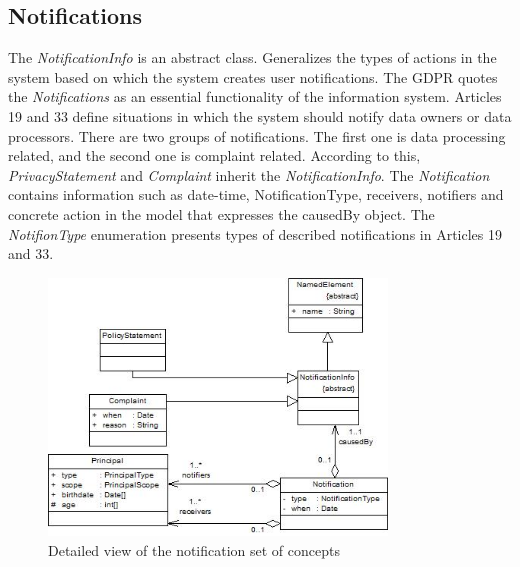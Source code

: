 \documentclass[11pt,english]{article}
\begin{document}
\subsection{Notifications}
The \emph{NotificationInfo} is an abstract class. Generalizes the types of actions in the system based on which the system creates user notifications. The GDPR quotes the \emph{Notifications} as an essential functionality of the information system. Articles 19 and 33 define situations in which the system should notify data owners or data processors. There are two groups of notifications. The first one is data processing related, and the second one is complaint related. According to this, \emph{PrivacyStatement} and \emph{Complaint} inherit the \emph{NotificationInfo}. The \emph{Notification} contains information such as date-time, NotificationType, receivers, notifiers and concrete action in the model that expresses the causedBy object. The \emph{NotifionType} enumeration presents types of described notifications in Articles 19 and 33.
\begin{figure}[H]
    \centering
    \includegraphics[width=9cm,scale=0.5]{images/notification.jpg}
    \caption{Detailed view of the notification set of concepts}
    \label{fig:Notifications}
\end{figure}
\end{document}
